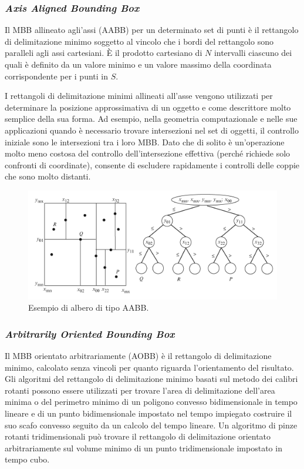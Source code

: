 \subsubsection{\textit{Axis Aligned Bounding Box}}
Il \ac{MBB} allineato agli'assi (\ac{AABB}) per un determinato set di punti è il rettangolo di delimitazione minimo soggetto al vincolo che i bordi del rettangolo sono paralleli agli assi cartesiani. È il prodotto cartesiano di $N$ intervalli ciascuno dei quali è definito da un valore minimo e un valore massimo della coordinata corrispondente per i punti in $S$.

I rettangoli di delimitazione minimi allineati all'asse vengono utilizzati per determinare la posizione approssimativa di un oggetto e come descrittore molto semplice della sua forma. Ad esempio, nella geometria computazionale e nelle sue applicazioni quando è necessario trovare intersezioni nel set di oggetti, il controllo iniziale sono le intersezioni tra i loro \ac{MBB}. Dato che di solito è un'operazione molto meno costosa del controllo dell'intersezione effettiva (perché richiede solo confronti di coordinate), consente di escludere rapidamente i controlli delle coppie che sono molto distanti.

\begin{figure}[h]
	\centering
	\includegraphics[width=\linewidth]{Figures/AABB}
	\caption{Esempio di albero di tipo AABB.}
	\label{AABB}
\end{figure}
%
\subsubsection{\textit{Arbitrarily Oriented Bounding Box}}
Il \ac{MBB} orientato arbitrariamente (\ac{AOBB}) è il rettangolo di delimitazione minimo, calcolato senza vincoli per quanto riguarda l'orientamento del risultato. Gli algoritmi del rettangolo di delimitazione minimo basati sul metodo dei calibri rotanti possono essere utilizzati per trovare l'area di delimitazione dell'area minima o del perimetro minimo di un poligono convesso bidimensionale in tempo lineare e di un punto bidimensionale impostato nel tempo impiegato costruire il suo scafo convesso seguito da un calcolo del tempo lineare. Un algoritmo di pinze rotanti tridimensionali può trovare il rettangolo di delimitazione orientato arbitrariamente sul volume minimo di un punto tridimensionale impostato in tempo cubo.
%
